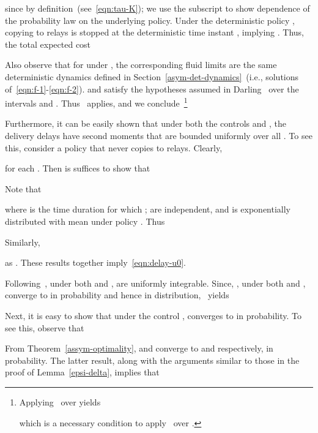 \documentclass[10pt,journal,letterpaper]{IEEEtran}
\newcommand{\remove}[1]{}
\begin{document}
since  by definition~(see~\eqref{eqn:tau-K});
we use the subscript  to show dependence of the probability law on the underlying policy.
Under the deterministic policy , copying to relays is stopped at the deterministic
time instant , implying . Thus, the total expected cost

Also observe that for  under , the corresponding fluid limits are
the same deterministic dynamics  defined in
Section~\ref{asym-det-dynamics}~(i.e., solutions of~\eqref{eqn:f-1}-\eqref{eqn:f-2}).
 and  satisfy the hypotheses assumed in Darling~\cite{stochproc.darling02fluid-limits} over the intervals
 and . Thus~\cite[Theorem~2.8]{stochproc.darling02fluid-limits}
applies, and we conclude~\footnote{Applying~\cite[Theorem~2.8]{stochproc.darling02fluid-limits} over  yields

which is a necessary condition to apply~\cite[Theorem~2.8]{stochproc.darling02fluid-limits} over .}


\remove{
Furthermore, it can be easily shown that under both the controls  and ,
the delivery delays  have second moments which are bounded uniformly over all , i.e.,\footnote{The proof entails
binding ~(under the control  or ) by the delivery delays under the policy that never
copies to relays, and showing that the latter have second moments which are bounded uniformly over all .}

}
Furthermore, it can be easily shown that under both the controls  and ,
the delivery delays  have second moments that are bounded uniformly over all . To see this,
consider a policy  that never copies to relays. Clearly,

for each . Then is suffices to show that

Note that

where  is the time duration for which ;  are independent,
and   is exponentially distributed with mean
 under policy  .
Thus

Similarly,

as . These results together imply~\eqref{eqn:delay-u0}.

Following~\cite[Remark~9.5.1]{stochproc.measure-and-probability}, under both  and ,
 are uniformly integrable. Since, , under both  and , converge to 
in probability and hence in distribution,~\cite[Theorem~9.5.1]{stochproc.measure-and-probability} yields


Next, it is easy to show that under the control ,  converges
to  in probability. To see this, observe that

From Theorem~\ref{assym-optimality},  and  converge to  and  respectively, in probability.
The latter result, along with the arguments similar to those in the proof of Lemma~\ref{epsi-delta}, implies
that
\end{document}
